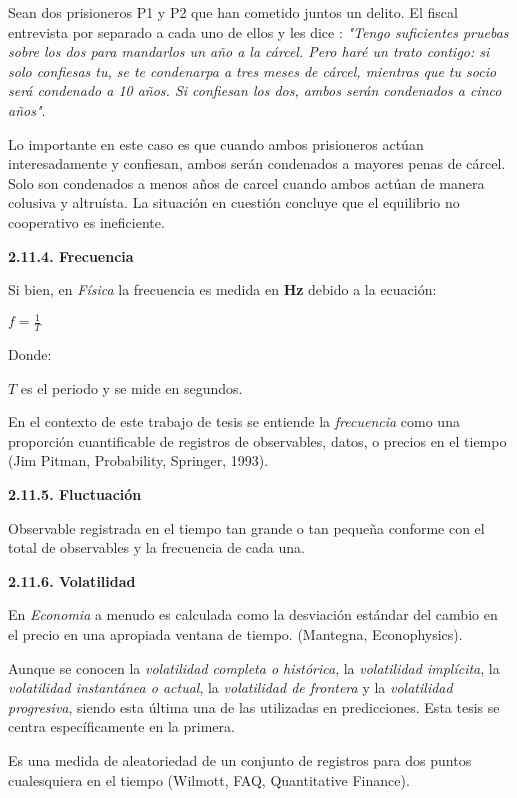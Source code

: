 Sean dos prisioneros P1 y P2  que han cometido juntos un delito. El fiscal entrevista por separado a cada uno de ellos y les dice : \textit{"Tengo suficientes pruebas sobre los dos para mandarlos un año a la cárcel. Pero haré un trato contigo: si solo confiesas tu, se te condenarpa a tres meses de cárcel, mientras que tu socio será condenado a 10 años. Si confiesan los dos, ambos serán condenados a cinco años"}. 

Lo importante en este caso es que cuando ambos prisioneros actúan interesadamente y confiesan, ambos serán condenados a mayores penas de cárcel. Solo son condenados a menos años de carcel cuando ambos actúan de manera colusiva y altruísta. La situación en cuestión concluye que el equilibrio no cooperativo es ineficiente. 
\newpage

{
\Large  \textbf{2.11.4. Frecuencia} 
}

Si bien, en \textit{Física} la frecuencia es medida en \textbf{Hz} debido a la ecuación:
\begin{center}
$f=\frac{1}{\textit{T}}$
\end{center}

Donde: 

$\textit{T}  $ es el periodo y se mide en segundos.

En el contexto de este trabajo de tesis se entiende la \textit{frecuencia} como una proporción cuantificable de registros de observables, datos, o precios en el tiempo (Jim Pitman, Probability, Springer, 1993).

{
\Large  \textbf{2.11.5. Fluctuación} 
}


Observable registrada en el tiempo tan grande o tan pequeña conforme con el total de observables y la frecuencia de cada una. 

{
\Large  \textbf{2.11.6. Volatilidad} 
}

En \textit{Economia} a menudo es calculada como la desviación estándar del cambio en el precio en una apropiada ventana de tiempo. (Mantegna, Econophysics).

Aunque se conocen la \textit{volatilidad completa o histórica}, la \textit{volatilidad implícita}, la  \textit{volatilidad instantánea o actual}, la \textit{volatilidad de frontera} y la \textit{volatilidad progresiva}, siendo esta última una de las utilizadas en predicciones. Esta tesis se centra específicamente en la primera.

Es una medida de aleatoriedad de un conjunto de registros para dos puntos cualesquiera en el tiempo (Wilmott, FAQ, Quantitative Finance). 

